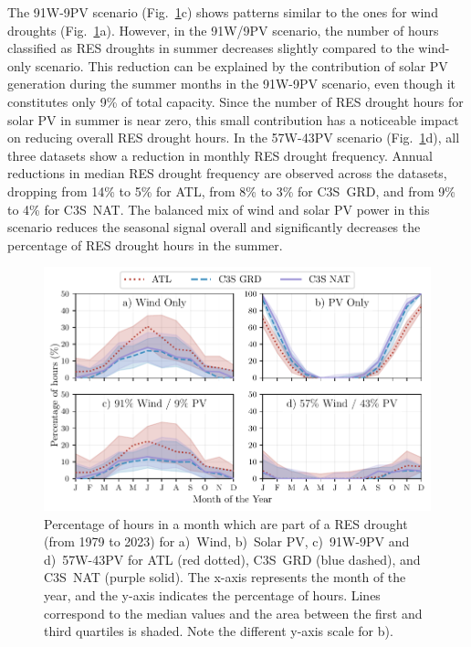 \documentclass[preprint, 12pt]{elsarticle}
\begin{document}
The 91W-9PV scenario (Fig.~\ref{fig:res_droughts_seasonality}c) shows patterns similar to the ones for wind droughts (Fig.~\ref{fig:res_droughts_seasonality}a). However, in the 91W/9PV scenario, the number of hours classified as RES droughts in summer decreases slightly compared to the wind-only scenario. This reduction can be explained by the contribution of solar PV generation during the summer months in the 91W-9PV scenario, even though it constitutes only 9\% of total capacity. Since the number of RES drought hours for solar PV in summer is near zero, this small contribution has a noticeable impact on reducing overall RES drought hours. In the 57W-43PV scenario (Fig.~\ref{fig:res_droughts_seasonality}d), all three datasets show a reduction in monthly RES drought frequency. Annual reductions in median RES drought frequency are observed across the datasets, dropping from 14\% to 5\% for ATL, from 8\% to 3\% for C3S~GRD, and from 9\% to 4\% for C3S~NAT. The balanced mix of wind and solar PV power in this scenario reduces the seasonal signal overall and significantly decreases the percentage of RES drought hours in the summer.

\begin{figure}[!ht]
	\centering
	\includegraphics[width=\textwidth]{droughts_seasonality.pdf}
	\caption{Percentage of hours in a month which are part of a RES drought (from 1979 to 2023) for a)~Wind, b)~Solar PV, c)~91W-9PV and d)~57W-43PV for ATL (red dotted), C3S~GRD (blue dashed), and C3S~NAT (purple solid). The x-axis represents the month of the year, and the y-axis indicates the percentage of hours. Lines correspond to the median values and the area between the first and third quartiles is shaded. Note the different y-axis scale for b).}
	\label{fig:res_droughts_seasonality}
\end{figure}
\end{document}
